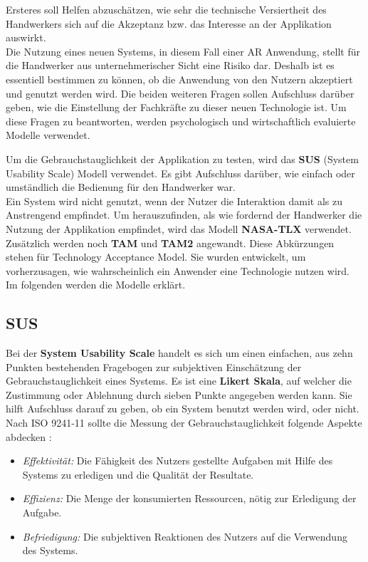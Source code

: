 Ersteres soll Helfen abzuschätzen, wie sehr die technische Versiertheit des Handwerkers sich auf die Akzeptanz bzw. das Interesse an der Applikation auswirkt. \\
Die Nutzung eines neuen Systems, in diesem Fall einer AR Anwendung, stellt für die Handwerker aus unternehmerischer Sicht eine Risiko dar. Deshalb ist es essentiell bestimmen zu können, ob die Anwendung von den Nutzern akzeptiert und genutzt werden wird. Die beiden weiteren Fragen sollen Aufschluss darüber geben, wie die Einstellung der Fachkräfte zu dieser neuen Technologie ist. Um diese Fragen zu beantworten, werden psychologisch und wirtschaftlich evaluierte Modelle verwendet. 

Um die Gebrauchstauglichkeit der Applikation zu testen, wird das \textbf{SUS} (System Usability Scale) \cite{brooke_sus_nodate} Modell verwendet. Es gibt Aufschluss darüber, wie einfach oder umständlich die Bedienung für den Handwerker war. \\
Ein System wird nicht genutzt, wenn der Nutzer die Interaktion damit als zu Anstrengend empfindet. Um herauszufinden, als wie fordernd der Handwerker die Nutzung der Applikation empfindet, wird das Modell \textbf{NASA-TLX} verwendet. \\
Zusätzlich werden noch \textbf{TAM} und \textbf{TAM2} angewandt. Diese Abkürzungen stehen für Technology Acceptance Model. Sie wurden entwickelt, um vorherzusagen, wie wahrscheinlich ein Anwender eine Technologie nutzen wird. \\
Im folgenden werden die Modelle erklärt.

\subsection{SUS}

Bei der \textbf{System Usability Scale} handelt es sich um einen einfachen, aus zehn Punkten bestehenden Fragebogen zur subjektiven Einschätzung der Gebrauchstauglichkeit eines Systems. Es ist eine \textbf{Likert Skala}, auf welcher die Zustimmung oder Ablehnung durch sieben Punkte angegeben werden kann. Sie hilft Aufschluss darauf zu geben, ob ein System benutzt werden wird, oder nicht. \\
Nach ISO 9241-11 sollte die Messung der Gebrauchstauglichkeit folgende Aspekte abdecken \cite{brooke_sus_nodate}:

\begin{itemize}
	\item \textit{Effektivität:} Die Fähigkeit des Nutzers gestellte Aufgaben mit Hilfe des Systems zu erledigen und die Qualität der Resultate.
	\item \textit{Effizienz:} Die Menge der konsumierten Ressourcen, nötig zur Erledigung der Aufgabe.
	\item \textit{Befriedigung:} Die subjektiven Reaktionen des Nutzers auf die Verwendung des Systems.
\end{itemize}

